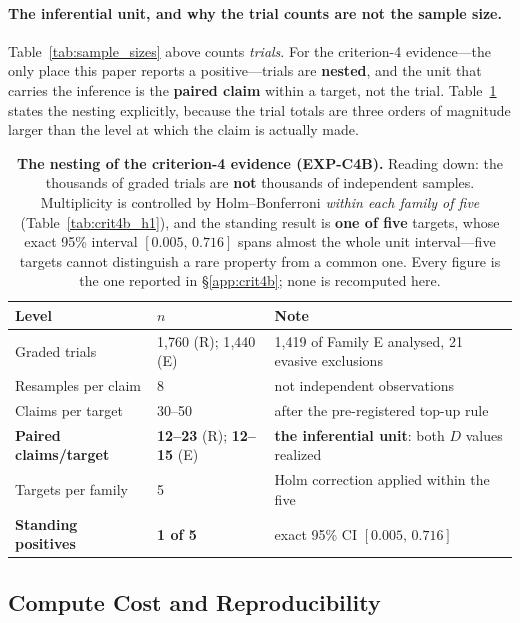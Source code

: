 \paragraph{The inferential unit, and why the trial counts are not the sample size.} Table~\ref{tab:sample_sizes} above counts \emph{trials}. For the criterion-4 evidence---the only place this paper reports a positive---trials are \textbf{nested}, and the unit that carries the inference is the \textbf{paired claim} within a target, not the trial. Table~\ref{tab:inference_ladder} states the nesting explicitly, because the trial totals are three orders of magnitude larger than the level at which the claim is actually made.

\begin{table}[h]
\centering
\caption{\textbf{The nesting of the criterion-4 evidence (EXP-C4B).} Reading down: the thousands of graded trials are \textbf{not} thousands of independent samples. Multiplicity is controlled by Holm--Bonferroni \emph{within each family of five} (Table~\ref{tab:crit4b_h1}), and the standing result is \textbf{one of five} targets, whose exact 95\% interval $[0.005,\,0.716]$ spans almost the whole unit interval---five targets cannot distinguish a rare property from a common one. Every figure is the one reported in §\ref{app:crit4b}; none is recomputed here.}
\label{tab:inference_ladder}
\begin{small}
\begin{tabular}{@{}llp{2.05in}@{}}
\toprule
\textbf{Level} & \textbf{$n$} & \textbf{Note} \\
\midrule
Graded trials & 1{,}760 (R); 1{,}440 (E) & 1{,}419 of Family E analysed, 21 evasive exclusions \\
Resamples per claim & 8 & not independent observations \\
Claims per target & 30--50 & after the pre-registered top-up rule \\
\textbf{Paired claims/target} & \textbf{12--23} (R); \textbf{12--15} (E) & \textbf{the inferential unit}: both $D$ values realized \\
Targets per family & 5 & Holm correction applied within the five \\
\textbf{Standing positives} & \textbf{1 of 5} & exact 95\% CI $[0.005,\,0.716]$ \\
\bottomrule
\end{tabular}
\end{small}
\end{table}

\subsection{Compute Cost and Reproducibility}
\label{app:compute_cost}

